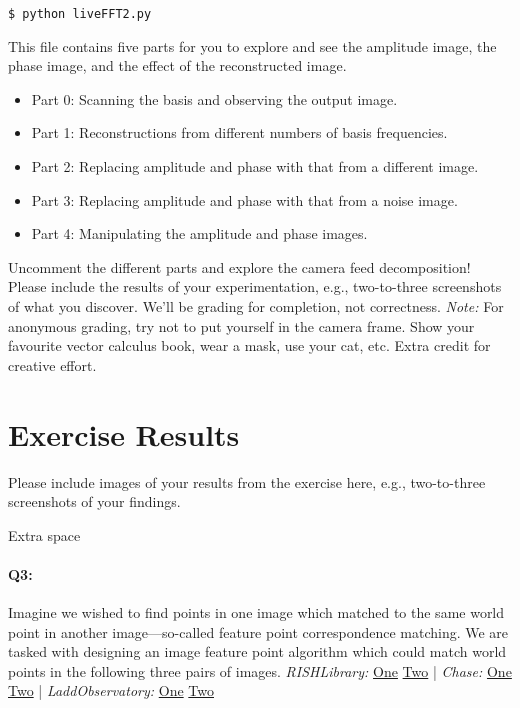 \begin{verbatim}
$ python liveFFT2.py
\end{verbatim}

This file contains five parts for you to explore and see the amplitude image, the phase image, and the effect of the reconstructed image.
\begin{itemize}
    \item Part 0: Scanning the basis and observing the output image.
    \item Part 1: Reconstructions from different numbers of basis frequencies.
    \item Part 2: Replacing amplitude and phase with that from a different image.
    \item Part 3: Replacing amplitude and phase with that from a noise image.
    \item Part 4: Manipulating the amplitude and phase images.
\end{itemize}

Uncomment the different parts and explore the camera feed decomposition! Please include the results of your experimentation, e.g., two-to-three screenshots of what you discover. We'll be grading for completion, not correctness. \emph{Note:} For anonymous grading, try not to put yourself in the camera frame. Show your favourite vector calculus book, wear a mask, use your cat, etc. Extra credit for creative effort.


\pagebreak
\section*{Exercise Results}
Please include images of your results from the exercise here, e.g., two-to-three screenshots of your findings.




\pagebreak
Extra space





\pagebreak

\paragraph{Q3:} Imagine we wished to find points in one image which matched to the same world point in another image---so-called feature point correspondence matching. We are tasked with designing an image feature point algorithm which could match world points in the following three pairs of images.
\newline
\newline
\emph{RISHLibrary:} \href{RISHLibrary1.jpg}{One} \href{RISHLibrary2.jpg}{Two} | \emph{Chase:} \href{Chase1.jpg}{One} \href{Chase2.jpg}{Two} | \emph{LaddObservatory:} \href{LaddObservatory1.jpg}{One} \href{LaddObservatory2.jpg}{Two}

